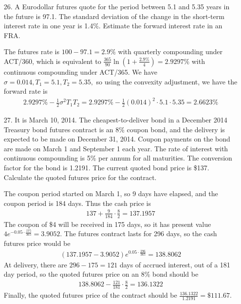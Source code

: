 \documentclass{article}
\begin{document}
\begin{itemize}
		\newpage
	\item[26.] A Eurodollar futures quote for the period between 5.1 and 5.35 years in the future is 97.1. The standard deviation of the change in the short-term interest rate in one year is 1.4\%. Estimate the forward interest rate in an FRA.
		\begin{soln}
			The futures rate is $100-97.1=2.9\%$ with quarterly compounding under ACT/360, which is equivalent to $\frac{365}{90}\ln\left( 1+\frac{2.9\%}{4} \right) = 2.9297\%$ with continuous compounding under ACT/365. We have $\sigma=0.014, T_1=5.1, T_2=5.35,$ so using the convexity adjustment, we have the forward rate is
			\begin{align*}
				2.9297\%-\frac{1}{2}\sigma^2T_1T_2=2.9297\%-\frac{1}{2}(0.014)^2\cdot 5.1\cdot 5.35 = 2.6623\%
			\end{align*}
		\end{soln}
		
	\item[27.] It is March 10, 2014. The cheapest-to-deliver bond in a December 2014 Treasury bond futures contract is an 8\% coupon bond, and the delivery is expected to be made on December 31, 2014. Coupon payments on the bond are made on March 1 and September 1 each year. The rate of interest with continuous compounding is 5\% per annum for all maturities. The conversion factor for the bond is 1.2191. The current quoted bond price is \$137. Calculate the quoted futures price for the contract.
		\begin{soln}
			The coupon period started on March 1, so 9 days have elapsed, and the coupon period is 184 days. Thus the cash price is
			\begin{align*}
				137+\frac{9}{184}\cdot \frac{8}{2} = 137.1957
			\end{align*}
			The coupon of \$4 will be received in 175 days, so it has present value $4e^{-0.05\cdot \frac{175}{365}} = 3.9052.$ The futures contract lasts for 296 days, so the cash futures price would be
			\begin{align*}
				(137.1957-3.9052)e^{0.05\cdot \frac{296}{365}} = 138.8062
			\end{align*}
			At delivery, there are $296-175=121$ days of accrued interest, out of a 181 day period, so the quoted futures price on an 8\% bond should be
			\begin{align*}
				138.8062-\frac{121}{181}\cdot \frac{8}{2} = 136.1322
			\end{align*}
			Finally, the quoted futures price of the contract should be $\frac{136.1322}{1.2191} = \$111.67.$
		\end{soln}
		
\end{itemize}
\end{document}
